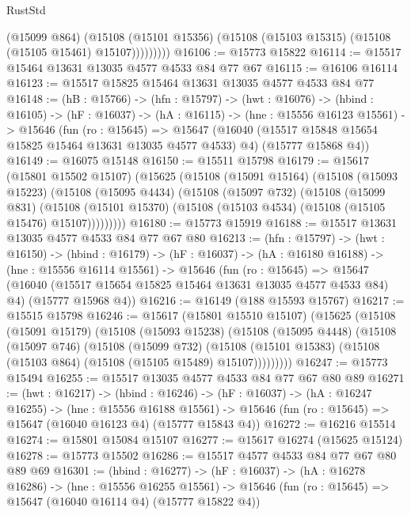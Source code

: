 \begin{lexlean}{RustStd}
\begin{coremodule}
                (@15099 @864)
                (@15108
                  (@15101 @15356)
                  (@15108 (@15103 @15315) (@15108 (@15105 @15461) @15107)))))))))
@16106 := @15773 @15822
@16114 := @15517 @15464 @13631 @13035 @4577 @4533 @84 @77 @67
@16115 := @16106 @16114
@16123 := @15517 @15825 @15464 @13631 @13035 @4577 @4533 @84 @77
@16148 := (hB : @15766) ->
  (hfn : @15797) ->
  (hwt : @16076) ->
  (hbind : @16105) ->
  (hF : @16037) ->
  (hA : @16115) ->
  (hne : @15556 @16123 @15561) ->
  @15646
    (fun (ro : @15645) =>
    @15647
      (@16040 (@15517 @15848 @15654 @15825 @15464 @13631 @13035 @4577 @4533) @4)
      (@15777 @15868 @4))
@16149 := @16075 @15148
@16150 := @15511 @15798
@16179 := @15617
    (@15801 @15502 @15107)
    (@15625
      (@15108
        (@15091 @15164)
        (@15108
          (@15093 @15223)
          (@15108
            (@15095 @4434)
            (@15108
              (@15097 @732)
              (@15108
                (@15099 @831)
                (@15108
                  (@15101 @15370)
                  (@15108 (@15103 @4534) (@15108 (@15105 @15476) @15107)))))))))
@16180 := @15773 @15919
@16188 := @15517 @13631 @13035 @4577 @4533 @84 @77 @67 @80
@16213 := (hfn : @15797) ->
  (hwt : @16150) ->
  (hbind : @16179) ->
  (hF : @16037) ->
  (hA : @16180 @16188) ->
  (hne : @15556 @16114 @15561) ->
  @15646
    (fun (ro : @15645) =>
    @15647
      (@16040 (@15517 @15654 @15825 @15464 @13631 @13035 @4577 @4533 @84) @4)
      (@15777 @15968 @4))
@16216 := @16149 (@188 @15593 @15767)
@16217 := @15515 @15798
@16246 := @15617
    (@15801 @15510 @15107)
    (@15625
      (@15108
        (@15091 @15179)
        (@15108
          (@15093 @15238)
          (@15108
            (@15095 @4448)
            (@15108
              (@15097 @746)
              (@15108
                (@15099 @732)
                (@15108
                  (@15101 @15383)
                  (@15108 (@15103 @864) (@15108 (@15105 @15489) @15107)))))))))
@16247 := @15773 @15494
@16255 := @15517 @13035 @4577 @4533 @84 @77 @67 @80 @89
@16271 := (hwt : @16217) ->
  (hbind : @16246) ->
  (hF : @16037) ->
  (hA : @16247 @16255) ->
  (hne : @15556 @16188 @15561) ->
  @15646 (fun (ro : @15645) => @15647 (@16040 @16123 @4) (@15777 @15843 @4))
@16272 := @16216 @15514
@16274 := @15801 @15084 @15107
@16277 := @15617 @16274 (@15625 @15124)
@16278 := @15773 @15502
@16286 := @15517 @4577 @4533 @84 @77 @67 @80 @89 @69
@16301 := (hbind : @16277) ->
  (hF : @16037) ->
  (hA : @16278 @16286) ->
  (hne : @15556 @16255 @15561) ->
  @15646 (fun (ro : @15645) => @15647 (@16040 @16114 @4) (@15777 @15822 @4))

\end{coremodule}
\end{lexlean}
